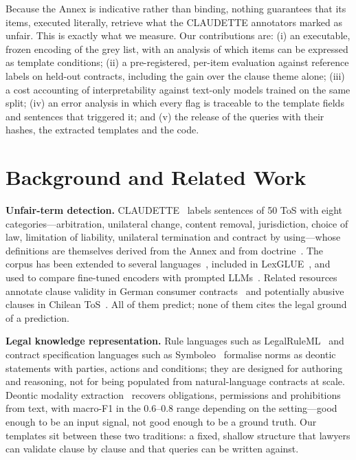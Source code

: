 \documentclass{IOS-Book-Article}
\newcommand{\corpus}{CLAUDETTE}
\begin{document}
Because the Annex is indicative rather than binding, nothing guarantees that its items, executed literally, retrieve what the \corpus{} annotators marked as unfair. This is exactly what we measure. Our contributions are: (i) an executable, frozen encoding of the grey list, with an analysis of which items can be expressed as template conditions; (ii) a pre-registered, per-item evaluation against reference labels on held-out contracts, including the gain over the clause theme alone; (iii) a cost accounting of interpretability against text-only models trained on the same split; (iv) an error analysis in which every flag is traceable to the template fields and sentences that triggered it; and (v) the release of the queries with their hashes, the extracted templates and the code.

\section{Background and Related Work}
\label{sec:related}
\textbf{Unfair-term detection.} \corpus{}~\cite{lippi2019claudette,lagioia2019deep} labels sentences of 50 ToS with eight categories---arbitration, unilateral change, content removal, jurisdiction, choice of law, limitation of liability, unilateral termination and contract by using---whose definitions are themselves derived from the Annex and from doctrine~\cite{micklitz2017empire}. The corpus has been extended to several languages~\cite{drawzeski2021corpus,galassi2024multilingual}, included in LexGLUE~\cite{chalkidis2022lexglue}, and used to compare fine-tuned encoders with prompted LLMs~\cite{panarelli2025worth}. Related resources annotate clause validity in German consumer contracts~\cite{braun2024agbde} and potentially abusive clauses in Chilean ToS~\cite{loffler2025chilean}. All of them predict; none of them cites the legal ground of a prediction.

\textbf{Legal knowledge representation.} Rule languages such as LegalRuleML~\cite{athan2015legalruleml} and contract specification languages such as Symboleo~\cite{sharifi2020symboleo} formalise norms as deontic statements with parties, actions and conditions; they are designed for authoring and reasoning, not for being populated from natural-language contracts at scale. Deontic modality extraction~\cite{chalkidis2018obligation,sancheti2022lexdemod} recovers obligations, permissions and prohibitions from text, with macro-F1 in the 0.6--0.8 range depending on the setting---good enough to be an input signal, not good enough to be a ground truth. Our templates sit between these two traditions: a fixed, shallow structure that lawyers can validate clause by clause and that queries can be written against.
\end{document}
